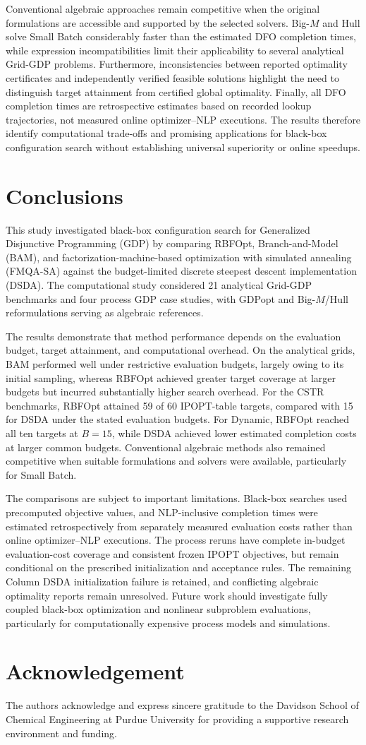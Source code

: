 \documentclass{article}
\begin{document}
Conventional algebraic approaches remain competitive when the original formulations are accessible and supported by the selected solvers. 
Big-$M$ and Hull solve Small Batch considerably faster than the estimated DFO completion times, while expression incompatibilities limit their applicability to several analytical Grid-GDP problems. 
Furthermore, inconsistencies between reported optimality certificates and independently verified feasible solutions highlight the need to distinguish target attainment from certified global optimality. 
Finally, all DFO completion times are retrospective estimates based on recorded lookup trajectories, not measured online optimizer--NLP executions.
The results therefore identify computational trade-offs and promising applications for black-box configuration search without establishing universal superiority or online speedups.

\section{Conclusions}

This study investigated black-box configuration search for Generalized Disjunctive Programming (GDP) by comparing RBFOpt, Branch-and-Model (BAM), and factorization-machine-based optimization with simulated annealing (FMQA-SA) against the budget-limited discrete steepest descent implementation (DSDA).
The computational study considered 21 analytical Grid-GDP benchmarks and four process GDP case studies, with GDPopt and Big-$M$/Hull reformulations serving as algebraic references.

The results demonstrate that method performance depends on the evaluation budget, target attainment, and computational overhead.
On the analytical grids, BAM performed well under restrictive evaluation budgets, largely owing to its initial sampling, whereas RBFOpt achieved greater target coverage at larger budgets but incurred substantially higher search overhead.
For the CSTR benchmarks, RBFOpt attained 59 of 60 IPOPT-table targets, compared with 15 for DSDA under the stated evaluation budgets.
For Dynamic, RBFOpt reached all ten targets at $B=15$, while DSDA achieved lower estimated completion costs at larger common budgets.
Conventional algebraic methods also remained competitive when suitable formulations and solvers were available, particularly for Small Batch.

The comparisons are subject to important limitations.
Black-box searches used precomputed objective values, and NLP-inclusive completion times were estimated retrospectively from separately measured evaluation costs rather than online optimizer--NLP executions.
The process reruns have complete in-budget evaluation-cost coverage and consistent frozen IPOPT objectives, but remain conditional on the prescribed initialization and acceptance rules. The remaining Column DSDA initialization failure is retained, and conflicting algebraic optimality reports remain unresolved.
Future work should investigate fully coupled black-box optimization and nonlinear subproblem evaluations, particularly for computationally expensive process models and simulations.

\section{Acknowledgement}
The authors acknowledge and express sincere gratitude to the Davidson School of Chemical Engineering at Purdue University for providing a supportive research environment and funding.

\printbibliography
\end{document}
